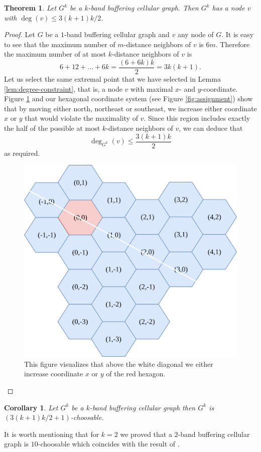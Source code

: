 \documentclass[a4paper, 12pt]{article}
\newtheorem{theo}[lem]{Theorem}
\newtheorem{corollary}[lem]{Corollary}
\begin{document}
\begin{theo}\label{theo:extremal-degree} Let $G^k$ be a $k$-band buffering cellular graph. Then $G^k$ has a node $v$ with $\deg(v) \leqslant 3(k+1)k/2$.
\end{theo}
\begin{proof} Let $G$ be a $1$-band buffering cellular graph and $v$ any node of $G$. It is easy to see that the maximum number of $m$-distance neighbors of $v$ is $6m$. Therefore the maximum number of at most $k$-distance neighbors of $v$ is 
$$6+12+\ldots+6k=\frac{(6 + 6k)k}{2} = 3k(k+1).$$
Let us select the same extremal point that we have selected in Lemma \ref{lem:degree-constraint}, that is, a node $v$ with maximal $x$- and $y$-coordinate. Figure \ref{fig:extremal-proof} and our hexagonal coordinate system (see Figure \ref{fig:assignment}) show that by moving either north, northeast or southeast, we increase either coordinate $x$ or $y$ that would violate the maximality of $v$. Since this region includes exactly the half of the possible at most $k$-distance neighbors of $v$, we can deduce that
$$\deg_{G^k}(v) \leqslant \frac{3(k+1)k}{2}$$ 
as required.
\begin{figure}[!h]
\centering
\includegraphics[scale=0.09]{figures/proof-k-band-buffering.png}
\caption{This figure visualizes that above the white diagonal we either increase coordinate $x$ or $y$ of the red hexagon.}\label{fig:extremal-proof}
\end{figure}
\end{proof}
\begin{corollary}\label{cor:main-result} Let $G^k$ be a $k$-band buffering cellular graph then $G^k$ is $(3(k+1)k/2+1)$-choosable.
\end{corollary}
It is worth mentioning that for $k=2$ we proved that a $2$-band buffering cellular graph is $10$-choosable which coincides with the result of \cite{7248845}. 
\end{document}
